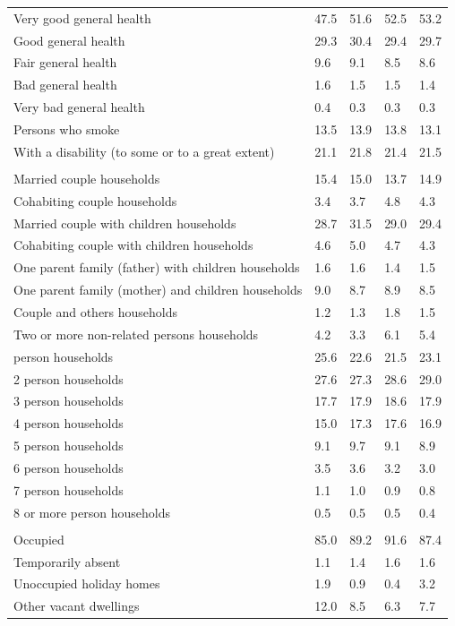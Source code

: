\documentclass{article}
\begin{document}
\begin{table}[h]
\begin{tabular}{KTTTT}
    \hline
Very good general health & 47.5& 51.6&52.5& 53.2\\
Good general health & 29.3& 30.4& 29.4& 29.7\\
Fair general health & 9.6& 9.1&8.5& 8.6\\
Bad general health & 1.6& 1.5&1.5& 1.4\\
Very bad general health & 0.4& 0.3&0.3& 0.3\\
    \hline
Persons who smoke & 13.5& 13.9&13.8& 13.1\\
    \hline
With a disability (to some or to a great extent) & 21.1& 21.8&21.4& 21.5\\
\hline
    \\ 
    \hline
Married couple households & 15.4& 15.0& 13.7& 14.9\\
Cohabiting couple households & 3.4& 3.7& 4.8& 4.3\\
Married couple with children households & 28.7& 31.5& 29.0& 29.4\\
Cohabiting couple with children households & 4.6& 5.0& 4.7& 4.3\\
One parent family (father) with  children households & 1.6& 1.6& 1.4& 1.5\\
One parent family (mother) and children households & 9.0& 8.7& 8.9& 8.5\\
Couple and others households  & 1.2& 1.3& 1.8& 1.5\\
Two or more non-related persons households & 4.2& 3.3& 6.1& 5.4\\
     person households & 25.6& 22.6& 21.5& 23.1\\
2 person households & 27.6& 27.3& 28.6& 29.0\\
3 person households & 17.7& 17.9& 18.6& 17.9\\
4 person households & 15.0& 17.3& 17.6& 16.9\\
5 person households & 9.1& 9.7& 9.1& 8.9\\
6 person households & 3.5& 3.6& 3.2& 3.0\\
7 person households & 1.1& 1.0& 0.9& 0.8\\
8 or more person households & 0.5& 0.5& 0.5& 0.4\\
\hline
    \\ 
    \hline
Occupied & 85.0& 89.2& 91.6& 87.4\\
Temporarily absent & 1.1& 1.4& 1.6& 1.6\\
Unoccupied holiday homes & 1.9& 0.9& 0.4& 3.2\\
Other vacant dwellings & 12.0&  8.5&  6.3&  7.7\\
\hline
\end{tabular}
\end{table}
\end{document}
